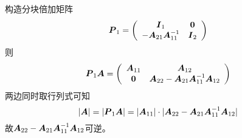 \begin{frame}
  \begin{jie}
    构造分块倍加矩阵
    $$
    \MP_1 = \left(
      \begin{array}{cc}
        \MI_1 & \M0\\
        -\MA_{21}\MA_{11}^{-1} & \MI_2
      \end{array}
    \right)
    $$
    则$$
    \MP_1\MA = \left(
      \begin{array}{cc}
        \MA_{11} & \MA_{12} \\
        \M0 & \MA_{22}-\MA_{21}\MA_{11}^{-1}\MA_{12}
      \end{array}
    \right)
    $$
    两边同时取行列式可知
    $$
    |\boldsymbol{A}| = |\boldsymbol{P}_1\boldsymbol{A}| = |\boldsymbol{A}_{11}|\cdot |\boldsymbol{A}_{22}-\boldsymbol{A}_{21}\boldsymbol{A}_{11}^{-1}\boldsymbol{A}_{12}|
    $$
    故$\boldsymbol{A}_{22}-\boldsymbol{A}_{21}\boldsymbol{A}_{11}^{-1}\boldsymbol{A}_{12}$可逆。
  \end{jie}
\end{frame}

